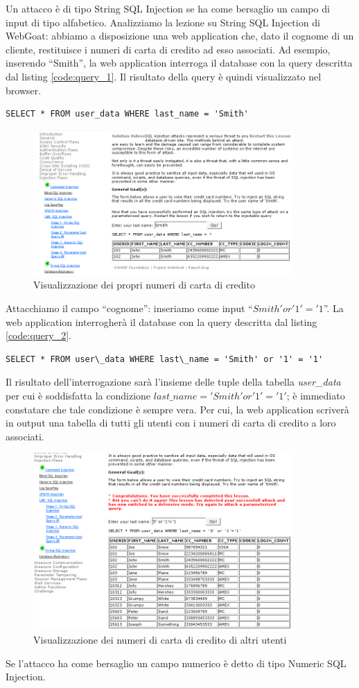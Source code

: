 \documentclass[a4paper,openright,italian]{article}
\begin{document}
Un attacco \`e di tipo String SQL Injection se ha come bersaglio un campo di input di tipo alfabetico.
Analizziamo la lezione su String SQL Injection di WebGoat: abbiamo a disposizione una web application che, dato il cognome di un cliente, restituisce i numeri di carta di credito ad esso associati. Ad esempio, inserendo ``Smith'', la web application interroga il database con la query descritta dal listing \ref{code:query_1}. Il risultato della query \`e quindi visualizzato nel browser.
\begin{lstlisting}[caption={Query di interrogazione}, label={code:query_1},frame=trBL]
  SELECT * FROM user_data WHERE last_name = 'Smith'
\end{lstlisting}
\begin{figure}[h]
\centering
\includegraphics[width=280pt]{images/sql_injection_1.png}
\caption{Visualizzazione dei propri numeri di carta di credito}
\end{figure}
Attacchiamo il campo ``cognome'': inseriamo come input ``{\it $Smith' or '1' = '1$}''. La web application interrogher\`a il database con la query descritta dal listing \ref{code:query_2}.
\begin{lstlisting}[caption={Query di interrogazione alterata}, label={code:query_2},frame=trBL]
  SELECT * FROM user\_data WHERE last\_name = 'Smith' or '1' = '1'
\end{lstlisting}
Il risultato dell'interrogazione sar\`a l'insieme delle tuple della tabella {\it user\_data} per cui \`e soddisfatta la condizione {\it $last\_name = 'Smith' or '1' = '1'$}; \`e immediato constatare che tale condizione \`e sempre vera. Per cui, la web application scriver\`a in output una tabella di tutti gli utenti con i numeri di carta di credito a loro associati.
\clearpage
\begin{figure}[h]
\centering
\includegraphics[width=280pt]{images/sql_injection_2.png}
\caption{Visualizzazione dei numeri di carta di credito di altri utenti}
\end{figure}
Se l'attacco ha come bersaglio un campo numerico \`e detto di tipo Numeric SQL Injection.
\end{document}
